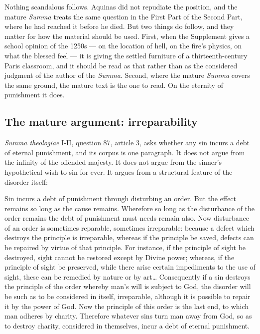 Nothing scandalous follows. Aquinas did not repudiate the position, and the mature \emph{Summa} treats the same question in the First Part of the Second Part, where he had reached it before he died. But two things do follow, and they matter for how the material should be used. First, when the Supplement gives a school opinion of the 1250s --- on the location of hell, on the fire's physics, on what the blessed feel --- it is giving the settled furniture of a thirteenth-century Paris classroom, and it should be read as that rather than as the considered judgment of the author of the \emph{Summa}. Second, where the mature \emph{Summa} covers the same ground, the mature text is the one to read. On the eternity of punishment it does.

\subsection{The mature argument: irreparability}

\emph{Summa theologiae} I-II, question 87, article 3, asks whether any sin incurs a debt of eternal punishment, and its corpus is one paragraph. It does not argue from the infinity of the offended majesty. It does not argue from the sinner's hypothetical wish to sin for ever. It argues from a structural feature of the disorder itself:

\begin{studyframe}
Sin incurs a debt of punishment through disturbing an order. But the effect remains so long as the cause remains. Wherefore so long as the disturbance of the order remains the debt of punishment must needs remain also. Now disturbance of an order is sometimes reparable, sometimes irreparable: because a defect which destroys the principle is irreparable, whereas if the principle be saved, defects can be repaired by virtue of that principle. For instance, if the principle of sight be destroyed, sight cannot be restored except by Divine power; whereas, if the principle of sight be preserved, while there arise certain impediments to the use of sight, these can be remedied by nature or by art\ldots{} Consequently if a sin destroys the principle of the order whereby man's will is subject to God, the disorder will be such as to be considered in itself, irreparable, although it is possible to repair it by the power of God. Now the principle of this order is the last end, to which man adheres by charity. Therefore whatever sins turn man away from God, so as to destroy charity, considered in themselves, incur a debt of eternal punishment.
\end{studyframe}

